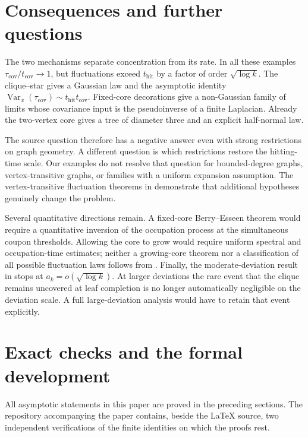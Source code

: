 \documentclass[11pt]{amsart}
\theoremstyle{remark}
\numberwithin{equation}{section}
\DeclareMathOperator{\Var}{Var}
\newcommand{\tcov}{t_{\mathrm{cov}}}
\newcommand{\thit}{t_{\mathrm{hit}}}
\newcommand{\taucov}{\tau_{\mathrm{cov}}}
\begin{document}
\section{Consequences and further questions}\label{sec:consequences}

The two mechanisms separate concentration from its rate. In all these examples $\taucov/\tcov\to 1$, but fluctuations exceed $\thit$ by a factor of order $\sqrt{\log k}$. The clique--star gives a Gaussian law and the asymptotic identity $\Var_x(\taucov)\sim\thit\tcov$. Fixed-core decorations give a non-Gaussian family of limits whose covariance input is the pseudoinverse of a finite Laplacian. Already the two-vertex core gives a tree of diameter three and an explicit half-normal law.

The source question therefore has a negative answer even with strong restrictions on graph geometry. A different question is which restrictions restore the hitting-time scale. Our examples do not resolve that question for bounded-degree graphs, vertex-transitive graphs, or families with a uniform expansion assumption. The vertex-transitive fluctuation theorems in \cite{BHT22} demonstrate that additional hypotheses genuinely change the problem.

Several quantitative directions remain. A fixed-core Berry--Esseen theorem would require a quantitative inversion of the occupation process at the simultaneous coupon thresholds. Allowing the core to grow would require uniform spectral and occupation-time estimates; neither a growing-core theorem nor a classification of all possible fluctuation laws follows from . Finally, the moderate-deviation result in  stops at $a_k=o(\sqrt{\log k})$. At larger deviations the rare event that the clique remains uncovered at leaf completion is no longer automatically negligible on the deviation scale. A full large-deviation analysis would have to retain that event explicitly.

\appendix

\section{Exact checks and the formal development}\label{app:checks}

All asymptotic statements in this paper are proved in the preceding sections. The repository \cite{Repo} accompanying the paper contains, beside the \LaTeX{} source, two independent verifications of the finite identities on which the proofs rest.
\end{document}
